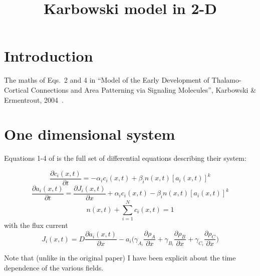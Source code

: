 \documentclass[11pt, a4paper]{article}
\title {
  Karbowski model in 2-D
}
\date{} %
\author{\Authors}
\begin{document}
\setlength{\droptitle}{-1.8cm} %
\maketitle

\vspace{-1.8cm} %

\section{Introduction}

The maths of Eqs.~2 and 4 in ``Model of the Early Development of
Thalamo-Cortical Connections and Area Patterning via Signaling
Molecules'', Karbowski \& Ermentrout, 2004~\cite{karbowski_model_2004}.

\section{One dimensional system}

Equations 1-4 of \cite{karbowski_model_2004} is the full set of
differential equations describing their system:

\begin{equation}
\frac{\partial c_i(x, t)}{\partial t} = -\alpha_i c_i(x, t) + \beta_i
n(x, t)[a_i(x, t)]^k
\end{equation}
%
\begin{equation}
\frac{\partial a_i(x, t)}{\partial t} = \frac{\partial J_i(x, t)}{\partial
x} + \alpha_i c_i(x, t) - \beta_i n(x, t)[a_i(x, t)]^k
\end{equation}
%
\begin{equation}
n(x, t) + \sum_{i=1}^{N} c_i(x, t) = 1
\end{equation}
%
with the flux current
%
\begin{equation}
J_i(x, t) = D \frac{\partial a_i(x, t)}{\partial x} - a_i
\bigg(\gamma_A_i \frac{\partial \rho_A}{\partial x} +\gamma_B_i \frac{\partial \rho_B}{\partial x} + \gamma_C_i \frac{\partial \rho_C}{\partial x} \bigg)
\end{equation}

Note that (unlike in the original paper) I have been explicit about
the time dependence of the various fields.
\end{document}
